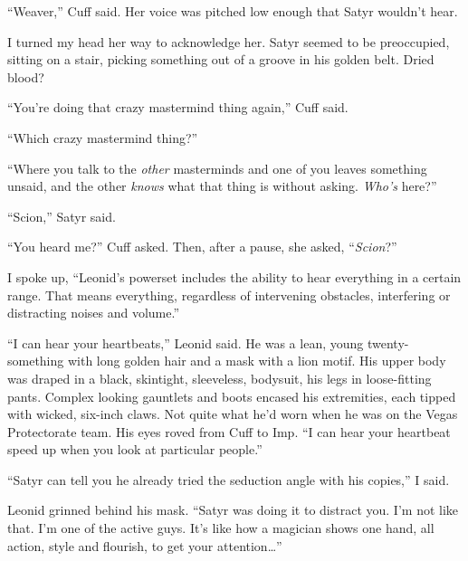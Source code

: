 





``Weaver,'' Cuff said.  Her voice was pitched low enough that Satyr wouldn't hear.



I turned my head her way to acknowledge her.  Satyr seemed to be preoccupied, sitting on a stair, picking something out of a groove in his golden belt.  Dried blood?



``You're doing that crazy mastermind thing again,'' Cuff said.



``Which crazy mastermind thing?''



``Where you talk to the \emph{other} masterminds and one of you leaves something unsaid, and the other \emph{knows} what that thing is without asking.  \emph{Who's} here?''



``Scion,'' Satyr said.



``You heard me?'' Cuff asked.  Then, after a pause, she asked, ``\emph{Scion}?''



I spoke up, ``Leonid's powerset includes the ability to hear everything in a certain range.  That means everything, regardless of intervening obstacles, interfering or distracting noises and volume.''



``I can hear your heartbeats,'' Leonid said.  He was a lean, young twenty-something with long golden hair and a mask with a lion motif.  His upper body was draped in a black, skintight, sleeveless, bodysuit, his legs in loose-fitting pants.  Complex looking gauntlets and boots encased his extremities, each tipped with wicked, six-inch claws.  Not quite what he'd worn when he was on the Vegas Protectorate team.  His eyes roved from Cuff to Imp.  ``I can hear your heartbeat speed up when you look at particular people.''



``Satyr can tell you he already tried the seduction angle with his copies,'' I said.



Leonid grinned behind his mask.  ``Satyr was doing it to distract you.  I'm not like that.  I'm one of the active guys.  It's like how a magician shows one hand, all action, style and flourish, to get your attention\ldots''



